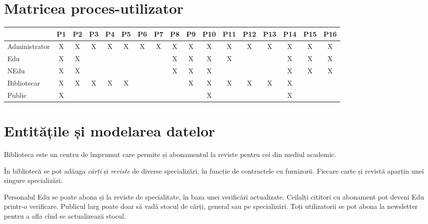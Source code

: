 
\section{Matricea proces-utilizator}
\label{sec:matrice-pu}

\begin{center}
    \small
    \begin{tabular}{|l|c|c|c|c|c|c|c|c|c|c|c|c|c|c|c|c|}
        \hline
    & P1 & P2 & P3 & P4 & P5 & P6 & P7 & P8 & P9 & P10 & P11 & P12 & P13 & P14 & P15 & P16 \\
    \hline \hline
        Administrator & X & X & X & X & X & X & X & X & X & X & X & X & X & X & X & X \\
        \hline
        Edu & X & X & & & & & & X & X & X & X & & & X & X & X \\
        \hline
        NEdu & X & X & & & & & & X & X & X & & & & X & X & X \\
        \hline
        Bibliotecar & X & X & X & X & X & & & & X & X & X & X & X & X & & \\
        \hline
        Public & X & & & & & & & & & X & & & & X & & \\
        \hline
    \end{tabular}
\end{center}


\section{Entitățile și modelarea datelor}
\label{sec:ent-model}

Biblioteca este un centru de împrumut care permite și abonamentul la reviste
pentru cei din mediul academic.

În bibliotecă se pot adăuga \emph{cărți} și \emph{reviste} de diverse
specializări, în funcție de contractele cu furnizorii. Fiecare
carte și revistă aparțin unei singure specializări.

Personalul Edu se poate abona și la reviste de specialitate, în baza
unei verificări actualizate. Ceilalți cititori cu abonament pot deveni
Edu printr-o verificare. Publicul larg poate doar să vadă stocul
de cărți, general sau pe specializări. Toți utilizatorii se pot abona
la newsletter pentru a afla cînd se actualizează stocul.

